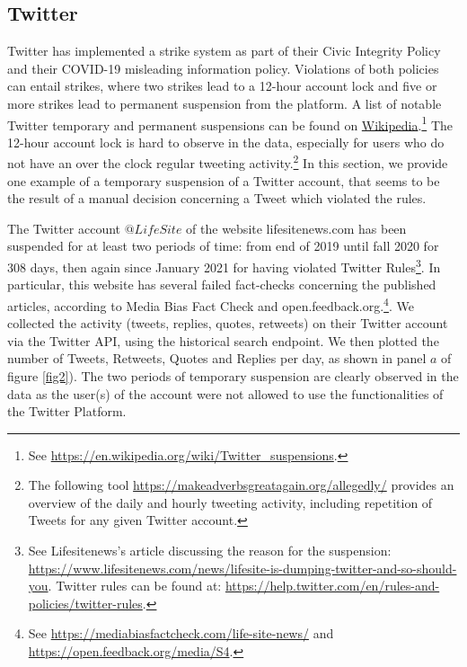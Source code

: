 \documentclass{article}
\begin{document}
\subsection{Twitter}

Twitter has implemented a strike system as part of their Civic Integrity Policy and their COVID-19 misleading information policy. Violations of both policies can entail strikes, where two strikes lead to a 12-hour account lock and five or more strikes lead to permanent suspension from the platform. A list of notable Twitter temporary and permanent suspensions can be found on  \href{https://en.wikipedia.org/wiki/Twitter_suspensions}{Wikipedia}.\footnote{See \href{https://en.wikipedia.org/wiki/Twitter\_suspensions}{https://en.wikipedia.org/wiki/Twitter\_suspensions}.}
The 12-hour account lock is hard to observe in the data, 
especially for users who do not have an over the clock regular tweeting activity.\footnote{The following tool \href{https://makeadverbsgreatagain.org/allegedly/}{https://makeadverbsgreatagain.org/allegedly/} provides an overview of the daily and hourly tweeting activity, including repetition of Tweets for any given Twitter account.} 
In this section, we provide one example of a temporary suspension of a Twitter account, that seems to be the result of a manual decision concerning a Tweet which violated the rules. 

The Twitter account $@LifeSite$ of the website lifesitenews.com has been suspended for at least two periods of time: from end of 2019 until fall 2020 for 308 days, then again since January 2021 for having violated Twitter Rules\footnote{See Lifesitenews's article discussing the reason for the suspension: \href{https://www.lifesitenews.com/news/lifesite-is-dumping-twitter-and-so-should-you}{https://www.lifesitenews.com/news/lifesite-is-dumping-twitter-and-so-should-you}. Twitter rules can be found at: \href{https://help.twitter.com/en/rules-and-policies/twitter-rules}{https://help.twitter.com/en/rules-and-policies/twitter-rules}. }. In particular, this website has several failed fact-checks concerning the published articles, according to Media Bias Fact Check and open.feedback.org.\footnote{See \href{https://mediabiasfactcheck.com/life-site-news/}{https://mediabiasfactcheck.com/life-site-news/} and \href{https://open.feedback.org/media/S4}{https://open.feedback.org/media/S4}.}. We collected the activity (tweets, replies, quotes, retweets) on their Twitter account via the Twitter API, using the historical search endpoint. We then plotted the number of Tweets, Retweets, Quotes and Replies per day, as shown in panel $a$ of figure \ref{fig2}). The two periods of temporary suspension are clearly observed in the data as the user(s) of the account were not allowed to use the functionalities of the Twitter Platform. 
\end{document}

